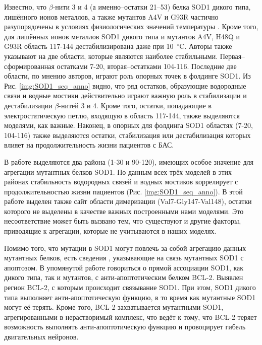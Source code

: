 Известно, что $\beta$-нити 3 и 4 (а именно--остатки 21–53) белка SOD1 дикого типа, лишённого ионов металлов, а также мутантов A4V и G93R частично разупорядочены в условиях физиологических значений температуры \cite{Durazo2009}. Кроме того, для лишённых ионов металлов SOD1 дикого типа и мутантов A4V, H48Q и G93R область 117-144 дестабилизирована даже при 10~${}^\circ$C. Авторы также указывают на две области, которые являются наиболее стабильными. Первая--сформированная остатками 7-20, вторая--остатками 104-116. Последние две области, по мнению авторов, играют роль опорных точек в фолдинге SOD1. Из Рис. \ref{img:SOD1_seq_anno} видно, что ряд остатков, образующие водородные связи и водные мостики действительно играют важную роль в стабилизации и дестабилизации $\beta$-нитей 3 и 4. Кроме того, остатки, попадающие в электростатическую петлю, входящую в область 117-144, также выделяются моделями, как важные. Наконец, в опорных для фолдинга SOD1 областях (7-20, 104-116) также выделяются остатки, стабилизация или дестабилизация которых влияет на продолжительность жизни пациентов с БАС.

В работе \cite{Wright2013} выделяются два района (1-30 и 90-120), имеющих особое значение для агрегации мутантных белков SOD1. По данным всех трёх моделей в этих районах стабильность водородных связей и водных мостиков коррелирует с продолжительностью жизни пациентов (Рис. \ref{img:SOD1_seq_anno}). В этой работе \cite{Wright2013} выделен также сайт области димеризации (Val7-Gly147-Val148), остатки которого не выделены в качестве важных построенными нами моделями. Это несоответствие может быть вызвано тем, что существуют и другие факторы, приводящие к агрегации, которые не учитываются в наших моделях.

Помимо того, что мутации в SOD1 могут повлечь за собой агрегацию данных мутантных  белков, есть сведения \cite{Pasinelli2004}, указывающие на связь мутантных SOD1 с апоптозом. В упомянутой работе говориться о прямой ассоциации SOD1, как дикого типа, так и мутантов, с анти-апоптотическим белком BCL-2. Выявлен регион BCL-2, с которым происходит связывание SOD1. При этом, SOD1 дикого типа выполняет анти-апоптотическую функцию, в то время как мутантные SOD1 могут её терять. Кроме того, BCL-2 захватывается мутантными SOD1, агрегированными в нерастворимый комплекс, что ведёт к тому, что BCL-2 теряет возможность выполнять анти-апоптотическую функцию и провоцирует гибель двигательных нейронов.